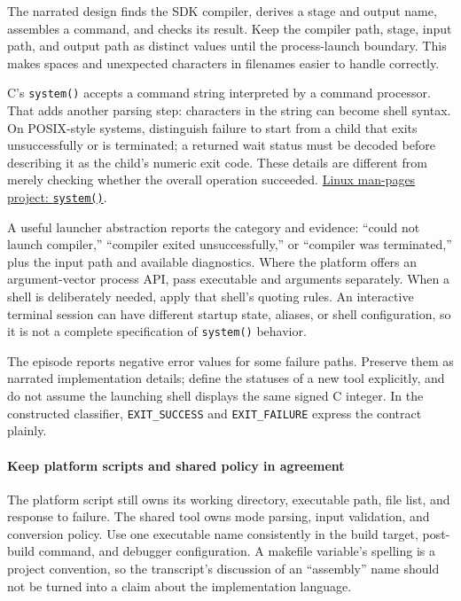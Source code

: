 The narrated design finds the SDK compiler, derives a stage and output name, assembles a command, and checks its result. Keep the compiler path, stage, input path, and output path as distinct values until the process-launch boundary. This makes spaces and unexpected characters in filenames easier to handle correctly.

C's \texttt{system()} accepts a command string interpreted by a command processor. That adds another parsing step: characters in the string can become shell syntax. On POSIX-style systems, distinguish failure to start from a child that exits unsuccessfully or is terminated; a returned wait status must be decoded before describing it as the child's numeric exit code. These details are different from merely checking whether the overall operation succeeded. \href{https://man7.org/linux/man-pages/man3/system.3.html}{Linux man-pages project: \texttt{system()}}.

A useful launcher abstraction reports the category and evidence: ``could not launch compiler,'' ``compiler exited unsuccessfully,'' or ``compiler was terminated,'' plus the input path and available diagnostics. Where the platform offers an argument-vector process API, pass executable and arguments separately. When a shell is deliberately needed, apply that shell's quoting rules. An interactive terminal session can have different startup state, aliases, or shell configuration, so it is not a complete specification of \texttt{system()} behavior.

The episode reports negative error values for some failure paths. Preserve them as narrated implementation details; define the statuses of a new tool explicitly, and do not assume the launching shell displays the same signed C integer. In the constructed classifier, \texttt{EXIT\_SUCCESS} and \texttt{EXIT\_FAILURE} express the contract plainly.

\paragraph{Keep platform scripts and shared policy in agreement}\label{05-engine-i-ch013-keep-platform-scripts-and-shared-policy-in-agreement}

The platform script still owns its working directory, executable path, file list, and response to failure. The shared tool owns mode parsing, input validation, and conversion policy. Use one executable name consistently in the build target, post-build command, and debugger configuration. A makefile variable's spelling is a project convention, so the transcript's discussion of an ``assembly'' name should not be turned into a claim about the implementation language.

